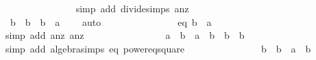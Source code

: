 \begin{isabellebody}
\ \ \ \ \ \ \ \ \ \ \ \ \ \ \isamarkupfalse%
{\isacharparenleft}simp\ add{\isacharcolon}\ divide{\isacharunderscore}simps\ a{}{\isacharunderscore}nz{\isacharparenright}\isanewline
\ \ \ \ \ \ \ \ \ \ \ \ \ \ \isamarkupfalse%
\isanewline
\ \ \ \ \ \ \ \ \ \ \ \ \isamarkupfalse%
\ \isamarkupfalse%
\ {\isachardoublequoteopen}{\isacharparenleft}b{}\ {\isacharslash}\ b{}{\isacharparenright}\ {\isacharasterisk}\ {\isacharparenleft}b{}{\isacharcircum}{}\ {\isacharminus}\ a{}{\isacharcircum}{}{\isacharparenright}\ {\isacharequal}\ {}{\isachardoublequoteclose}\ \isamarkupfalse%
\ auto\isanewline
\ \ \ \ \ \ \ \ \ \ \ \ \isamarkupfalse%
\ \isamarkupfalse%
\ eq{}{\isacharcolon}\ {\isachardoublequoteopen}{\isacharparenleft}b{}{\isacharcircum}{}\ {\isacharminus}\ a{}{\isacharcircum}{}{\isacharparenright}\ {\isacharequal}\ {}{\isachardoublequoteclose}\ \isanewline
\ \ \ \ \ \ \ \ \ \ \ \ \ \ \isamarkupfalse%
{\isacharparenleft}simp\ add{\isacharcolon}\ a{}{\isacharunderscore}nz\ a{}{\isacharunderscore}nz{\isacharparenright}\isanewline
\ \ \ \ \isanewline
\ \ \ \ \ \ \ \ \ \ \isamarkupfalse%
\ {\isachardoublequoteopen}a{}{\isacharcircum}{}\ {\isacharminus}\ b{}{\isacharcircum}{}\ {\isacharequal}\ a{}{\isacharcircum}{}\ {\isacharasterisk}\ {\isacharparenleft}b{}{\isacharcircum}{}\ {\isacharslash}\ b{}{\isacharcircum}{}{\isacharparenright}\ {\isacharminus}\ b{}{\isacharcircum}{}{\isachardoublequoteclose}\isanewline
\ \ \ \ \ \ \ \ \ \ \ \ \isamarkupfalse%
{\isacharparenleft}simp\ add{\isacharcolon}\ algebra{\isacharunderscore}simps\ eq{}\ power{}{\isacharunderscore}eq{\isacharunderscore}square{\isacharparenright}\isanewline
\ \ \ \ \ \ \ \ \ \ \isamarkupfalse%
\ \isamarkupfalse%
\ {\isachardoublequoteopen}{\isachardot}{\isachardot}{\isachardot}\ {\isacharequal}\ {\isacharparenleft}b{}{\isacharcircum}{}\ {\isacharslash}\ b{}{\isacharcircum}{}{\isacharparenright}\ {\isacharasterisk}\ {\isacharparenleft}a{}{\isacharcircum}{}\ {\isacharminus}\ b{}{\isacharcircum}{}{\isacharparenright}{\isachardoublequoteclose}\isanewline

\end{isabellebody}
